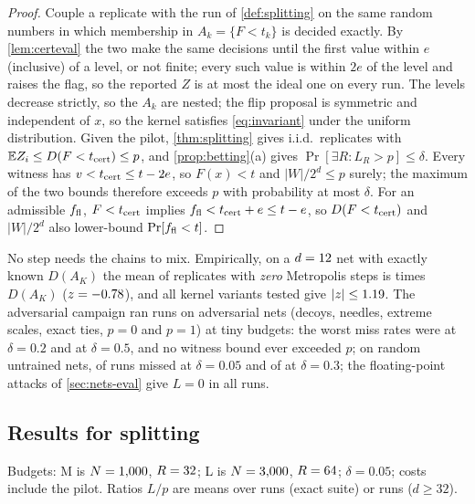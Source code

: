 \begin{proof}
Couple a replicate with the run of \cref{def:splitting} on the same random numbers in
which membership in $A_k=\{F<t_k\}$ is decided exactly. By \cref{lem:certeval} the two
make the same decisions until the first value within $e$ (inclusive) of a level, or not
finite; every such value is within $2e$ of the level and raises the flag, so the
reported $Z$ is at most the ideal one on every run. The levels decrease strictly, so the $A_k$ are nested; the flip proposal is
symmetric and independent of $x$, so the kernel satisfies \eqref{eq:invariant} under
the uniform distribution. Given the pilot, \cref{thm:splitting} gives i.i.d.\
replicates with $\mathbb{E} Z_i\le D(F<t_{\rm cert})\le p$, and \cref{prop:betting}(a) gives
$\Pr[\exists R:L_R>p]\le\delta$. Every witness has $v<t_{\rm cert}\le t-2e$, so $F(x)<t$
and $|W|/2^d\le p$ surely; the maximum of the two bounds therefore exceeds $p$ with
probability at most $\delta$. For an admissible $f_{\rm fl}$, $F<t_{\rm cert}$ implies
$f_{\rm fl}<t_{\rm cert}+e\le t-e$, so $D(F<t_{\rm cert})$ and $|W|/2^d$ also lower-bound
$\Pr[f_{\rm fl}<t]$.
\end{proof}

No step needs the chains to mix. Empirically, on a $d=12$ net with exactly known
$D(A_K)$ the mean of \nnNoMixReps{} replicates with \emph{zero} Metropolis steps is
\nnNoMixRatio{} times $D(A_K)$ ($z=-0.78$), and all \nnUnbVariants{} kernel
variants tested give $|z|\le1.19$. The adversarial campaign ran \nnCampRuns{}
runs on \nnCampNets{} adversarial nets (decoys, needles, extreme scales, exact ties,
$p=0$ and $p=1$) at tiny budgets: the worst miss rates were \nnCampWorstTwo{} at
$\delta=0.2$ and \nnCampWorstFive{} at $\delta=0.5$, and no witness bound ever exceeded
$p$; on random untrained nets, \nnRandMissFive{} of \nnRandMissFiveOf{} runs missed at
$\delta=0.05$ and \nnRandMissThirty{} of \nnRandMissThirtyOf{} at $\delta=0.3$; the
\nnFloatCases{} floating-point attacks of \cref{sec:nets-eval} give $L=0$ in all
\nnFloatRuns{} runs.

\subsection{Results for splitting}\label{sec:nets-smc}

Budgets: M is $N=1{,}000$, $R=32$; L is $N=3{,}000$, $R=64$;
$\delta=0.05$; costs include the pilot. Ratios $L/p$ are means over \nnSuiteRunsPer{}
runs (exact suite) or \nnScaleRunsPer{} runs ($d\ge32$).

